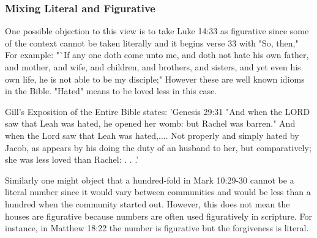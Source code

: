 \documentclass[11pt]{article}
\begin{document}
\subsubsection{Mixing Literal and Figurative}
One possible objection to this view is to take Luke 14:33 as figurative since some of the context cannot be taken literally and it begins verse 33 with "So, then," For example: "`If any one doth come unto me, and doth not hate his own father, and mother, and wife, and children, and brothers, and sisters, and yet even his own life, he is not able to be my disciple;" However these are well known idioms in the Bible. "Hated" means to be loved less in this case. \cite{hate means love less} 

Gill's Exposition of the Entire Bible states:
'Genesis 29:31
"And when the LORD saw that Leah was hated, he opened her womb: but Rachel was barren."
And when the Lord saw that Leah was hated,.... Not properly and simply hated by Jacob, as appears by his doing the duty of an husband to her, but comparatively; she was less loved than Rachel: . . .'

Similarly one might object that a hundred-fold in Mark 10:29-30 cannot be a literal number since it would vary between communities and would be less than a hundred when the community started out. However, this does not mean the houses are figurative because numbers are often used figuratively in scripture. For instance, in Matthew 18:22 the number is figurative but the forgiveness is literal.
\end{document}
